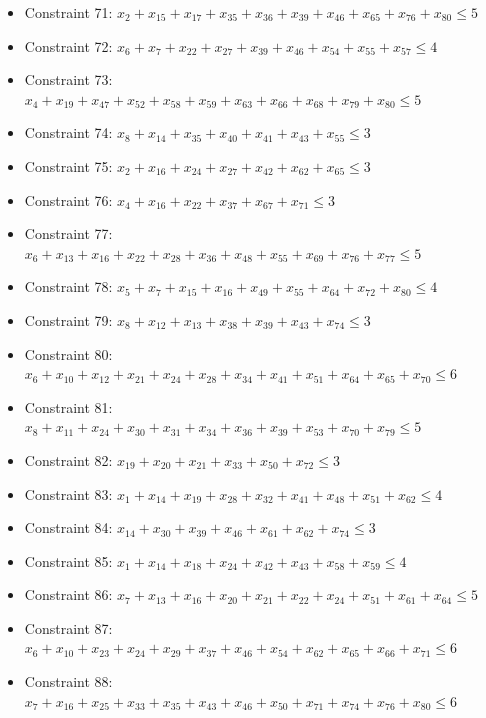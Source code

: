 \documentclass[11pt]{article}
\begin{document}
\begin{itemize}
\item Constraint 71: $x_{2} + x_{15} + x_{17} + x_{35} + x_{36} + x_{39} + x_{46} + x_{65} + x_{76} + x_{80} \le 5$
\item Constraint 72: $x_{6} + x_{7} + x_{22} + x_{27} + x_{39} + x_{46} + x_{54} + x_{55} + x_{57} \le 4$
\item Constraint 73: $x_{4} + x_{19} + x_{47} + x_{52} + x_{58} + x_{59} + x_{63} + x_{66} + x_{68} + x_{79} + x_{80} \le 5$
\item Constraint 74: $x_{8} + x_{14} + x_{35} + x_{40} + x_{41} + x_{43} + x_{55} \le 3$
\item Constraint 75: $x_{2} + x_{16} + x_{24} + x_{27} + x_{42} + x_{62} + x_{65} \le 3$
\item Constraint 76: $x_{4} + x_{16} + x_{22} + x_{37} + x_{67} + x_{71} \le 3$
\item Constraint 77: $x_{6} + x_{13} + x_{16} + x_{22} + x_{28} + x_{36} + x_{48} + x_{55} + x_{69} + x_{76} + x_{77} \le 5$
\item Constraint 78: $x_{5} + x_{7} + x_{15} + x_{16} + x_{49} + x_{55} + x_{64} + x_{72} + x_{80} \le 4$
\item Constraint 79: $x_{8} + x_{12} + x_{13} + x_{38} + x_{39} + x_{43} + x_{74} \le 3$
\item Constraint 80: $x_{6} + x_{10} + x_{12} + x_{21} + x_{24} + x_{28} + x_{34} + x_{41} + x_{51} + x_{64} + x_{65} + x_{70} \le 6$
\item Constraint 81: $x_{8} + x_{11} + x_{24} + x_{30} + x_{31} + x_{34} + x_{36} + x_{39} + x_{53} + x_{70} + x_{79} \le 5$
\item Constraint 82: $x_{19} + x_{20} + x_{21} + x_{33} + x_{50} + x_{72} \le 3$
\item Constraint 83: $x_{1} + x_{14} + x_{19} + x_{28} + x_{32} + x_{41} + x_{48} + x_{51} + x_{62} \le 4$
\item Constraint 84: $x_{14} + x_{30} + x_{39} + x_{46} + x_{61} + x_{62} + x_{74} \le 3$
\item Constraint 85: $x_{1} + x_{14} + x_{18} + x_{24} + x_{42} + x_{43} + x_{58} + x_{59} \le 4$
\item Constraint 86: $x_{7} + x_{13} + x_{16} + x_{20} + x_{21} + x_{22} + x_{24} + x_{51} + x_{61} + x_{64} \le 5$
\item Constraint 87: $x_{6} + x_{10} + x_{23} + x_{24} + x_{29} + x_{37} + x_{46} + x_{54} + x_{62} + x_{65} + x_{66} + x_{71} \le 6$
\item Constraint 88: $x_{7} + x_{16} + x_{25} + x_{33} + x_{35} + x_{43} + x_{46} + x_{50} + x_{71} + x_{74} + x_{76} + x_{80} \le 6$

\end{itemize}
\end{document}
